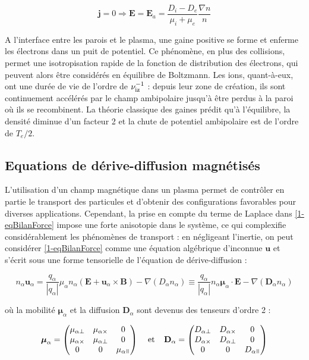 \begin{refsection}
\begin{equation}
\label{1-eqEAmb}
\mathbf j=0 \Rightarrow \mathbf E=\mathbf
E_a=\frac{D_i-D_e}{\mu_i+\mu_e}\frac{\nabla n}{n}
\end{equation}

A l'interface entre les parois et le plasma, une gaine positive se
forme et enferme les électrons dans un puit de potentiel. Ce phénomène, en plus
des collisions, permet une isotropisation rapide de la fonction de distribution
des électrons, qui peuvent alors être considérés en équilibre de Boltzmann.
Les ions, quant-à-eux, ont une durée de vie de l'ordre de
$\nu_\text{iz}^{{-1}}$ : depuis leur zone de création, ils sont
continuement accélérés par le champ ambipolaire jusqu'à être perdus à la paroi
où ils se recombinent. La théorie classique des gaines prédit qu'à l'équilibre,
la densité diminue d'un facteur 2 et la chute de potentiel ambipolaire est
de l'ordre de $T_e/2$.

\subsection{Equations de dérive-diffusion magnétisés}
L'utilisation d'un champ magnétique dans un plasma permet de contrôler en partie
le transport des particules et d'obtenir des configurations favorables pour
diverses applications. Cependant, la prise en compte du terme de Laplace dans
\eqref{1-eqBilanForce} impose une forte anisotopie dans le système, ce qui
complexifie considérablement les phénomènes de transport : en
négligeant l'inertie, on peut considérer \eqref{1-eqBilanForce} comme une
équation algébrique d'inconnue $\mathbf u$ et s'écrit sous une forme
tensorielle de l'équation de dérive-diffusion :

\begin{equation}
\label{1-eqDriftDif}
n_\alpha\mathbf u_\alpha=\frac{q_\alpha}{|q_\alpha|}\mu_\alpha
n_\alpha\left(\mathbf E+\mathbf u_\alpha\times\mathbf
B\right)-\nabla\left(D_\alpha n_\alpha\right)\equiv
\frac{q_\alpha}{|q_\alpha|} n_\alpha\boldsymbol{\mu}_\alpha\cdot \mathbf
E-{\nabla\left(\mathbf{D}_\alpha n_\alpha\right)}
\end{equation}

où la mobilité $\boldsymbol{\mu}_\alpha$ et la diffusion $\mathbf{D}_\alpha$
sont devenus des tenseurs d'ordre 2 :

\begin{align}
\boldsymbol{\mu}_\alpha =
 \begin{pmatrix}
  \mu_{\alpha\perp} & \mu_{\alpha\times} & 0 \\
  \mu_{\alpha\times} & \mu_{\alpha\perp} & 0 \\
  0  & 0  & \mu_{\alpha\para} 
 \end{pmatrix}\;\;\;\;\text{et}\;\;\;\;
 \mathbf D_\alpha =
 \begin{pmatrix}
  D_{\alpha\perp} & D_{\alpha\times} & 0 \\
  D_{\alpha\times} & D_{\alpha\perp} & 0 \\
  0  & 0  & D_{\alpha\para} 
 \end{pmatrix}
\end{align}


\end{refsection}
